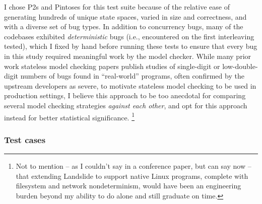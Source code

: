I chose P2s and Pintoses for this test suite because of the relative ease of generating hundreds of unique state spaces,
varied in size and correctness, and with a diverse set of bug types.
In addition to concurrency bugs,
many of the codebases exhibited {\em deterministic} bugs (i.e., encountered on the first interleaving tested),
which I fixed by hand before running these tests to ensure that every bug in this study required meaningful work by the model checker.
While many prior work stateless model checking papers
publish studies of single-digit or low-double-digit numbers of
bugs found in ``real-world'' programs, often confirmed by the upstream developers as severe,
to motivate stateless model checking to be used in production settings,
I believe this approach to be too anecdotal for comparing several model checking strategies {\em against each other},
and opt for this approach instead for better statistical significance.%
\footnote{Not to mention -- as I couldn't say in a conference paper, but can say now --
that extending Landslide to support native Linux programs,
complete with filesystem and network nondeterminism,
would have been an engineering burden beyond my ability to do alone and still graduate on time.}

\subsubsection{Test cases}
\label{sec:quicksand-eval-suite}

\newcommand\mxtest{\texttt{mutex\_test}\xspace}
\newcommand\tej{\texttt{thr\_exit\_join}\xspace}
\newcommand\bct{\texttt{broadcast\_test}\xspace}
\newcommand\paraguay{\texttt{paraguay}\xspace}
\newcommand\paradise{\texttt{paradise\_lost}\xspace}
\newcommand\rwldgr{\texttt{rwlock\_downgrade\_read\_test}\xspace}
\newcommand\prisema{\texttt{priority-sema}\xspace}
\newcommand\waitsimple{\texttt{wait-test}\xspace}
\newcommand\alarmsimul{\texttt{alarm-simultaneous}\xspace}


